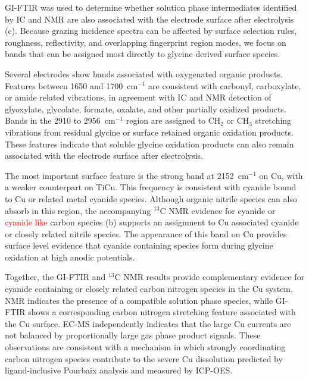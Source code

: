 \documentclass[twoside,twocolumn,9pt]{article}
\begin{document}

GI-FTIR was used to determine whether solution phase intermediates identified by IC and NMR are also associated with the electrode surface after electrolysis (c). Because grazing incidence spectra can be affected by surface selection rules, roughness, reflectivity, and overlapping fingerprint region modes, we focus on bands that can be assigned most directly to glycine derived surface species.

Several electrodes show bands associated with oxygenated organic products. Features between 1650 and 1700~cm$^{-1}$ are consistent with carbonyl, carboxylate, or amide related vibrations, in agreement with IC and NMR detection of glyoxylate, glycolate, formate, oxalate, and other partially oxidized products. Bands in the 2910 to 2956~cm$^{-1}$ region are assigned to CH$_2$ or CH$_3$ stretching vibrations from residual glycine or surface retained organic oxidation products. These features indicate that soluble glycine oxidation products can also remain associated with the electrode surface after electrolysis.

The most important surface feature is the strong band at 2152~cm$^{-1}$ on Cu, with a weaker counterpart on TiCu. This frequency is consistent with cyanide bound to Cu or related metal cyanide species. Although organic nitrile species can also absorb in this region, the accompanying $^{13}$C NMR evidence for cyanide or \textcolor{red}{cyanide like} carbon species (b) supports an assignment to Cu associated cyanide or closely related nitrile species. The appearance of this band on Cu provides surface level evidence that cyanide containing species form during glycine oxidation at high anodic potentials.

Together, the GI-FTIR and \(^{13}\)C NMR results provide complementary evidence for cyanide containing or closely related carbon nitrogen species in the Cu system. NMR indicates the presence of a compatible solution phase species, while GI-FTIR shows a corresponding carbon nitrogen stretching feature associated with the Cu surface. EC-MS independently indicates that the large Cu currents are not balanced by proportionally large gas phase product signals. These observations are consistent with a mechanism in which strongly coordinating carbon nitrogen species contribute to the severe Cu dissolution predicted by ligand-inclusive Pourbaix analysis and measured by ICP-OES.
\end{document}
